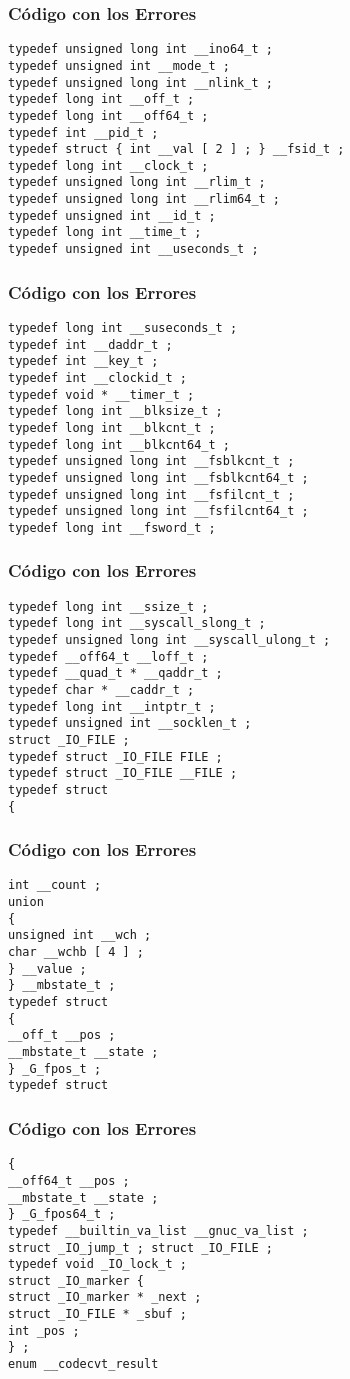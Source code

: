 \documentclass{beamer}
\begin{document}
\begin{frame}[fragile]
\frametitle{C\'odigo con los Errores}
\begin{lstlisting}[style=CStyle]
typedef unsigned long int __ino64_t ; 
typedef unsigned int __mode_t ; 
typedef unsigned long int __nlink_t ; 
typedef long int __off_t ; 
typedef long int __off64_t ; 
typedef int __pid_t ; 
typedef struct { int __val [ 2 ] ; } __fsid_t ; 
typedef long int __clock_t ; 
typedef unsigned long int __rlim_t ; 
typedef unsigned long int __rlim64_t ; 
typedef unsigned int __id_t ; 
typedef long int __time_t ; 
typedef unsigned int __useconds_t ; 
\end{lstlisting}
\end{frame}
\begin{frame}[fragile]
\frametitle{C\'odigo con los Errores}
\begin{lstlisting}[style=CStyle]
typedef long int __suseconds_t ; 
typedef int __daddr_t ; 
typedef int __key_t ; 
typedef int __clockid_t ; 
typedef void * __timer_t ; 
typedef long int __blksize_t ; 
typedef long int __blkcnt_t ; 
typedef long int __blkcnt64_t ; 
typedef unsigned long int __fsblkcnt_t ; 
typedef unsigned long int __fsblkcnt64_t ; 
typedef unsigned long int __fsfilcnt_t ; 
typedef unsigned long int __fsfilcnt64_t ; 
typedef long int __fsword_t ; 
\end{lstlisting}
\end{frame}
\begin{frame}[fragile]
\frametitle{C\'odigo con los Errores}
\begin{lstlisting}[style=CStyle]
typedef long int __ssize_t ; 
typedef long int __syscall_slong_t ; 
typedef unsigned long int __syscall_ulong_t ; 
typedef __off64_t __loff_t ; 
typedef __quad_t * __qaddr_t ; 
typedef char * __caddr_t ; 
typedef long int __intptr_t ; 
typedef unsigned int __socklen_t ; 
struct _IO_FILE ; 
typedef struct _IO_FILE FILE ; 
typedef struct _IO_FILE __FILE ; 
typedef struct 
{ 
\end{lstlisting}
\end{frame}
\begin{frame}[fragile]
\frametitle{C\'odigo con los Errores}
\begin{lstlisting}[style=CStyle]
int __count ; 
union 
{ 
unsigned int __wch ; 
char __wchb [ 4 ] ; 
} __value ; 
} __mbstate_t ; 
typedef struct 
{ 
__off_t __pos ; 
__mbstate_t __state ; 
} _G_fpos_t ; 
typedef struct 
\end{lstlisting}
\end{frame}
\begin{frame}[fragile]
\frametitle{C\'odigo con los Errores}
\begin{lstlisting}[style=CStyle]
{ 
__off64_t __pos ; 
__mbstate_t __state ; 
} _G_fpos64_t ; 
typedef __builtin_va_list __gnuc_va_list ; 
struct _IO_jump_t ; struct _IO_FILE ; 
typedef void _IO_lock_t ; 
struct _IO_marker { 
struct _IO_marker * _next ; 
struct _IO_FILE * _sbuf ; 
int _pos ; 
} ; 
enum __codecvt_result 
\end{lstlisting}
\end{frame}
\end{document}
